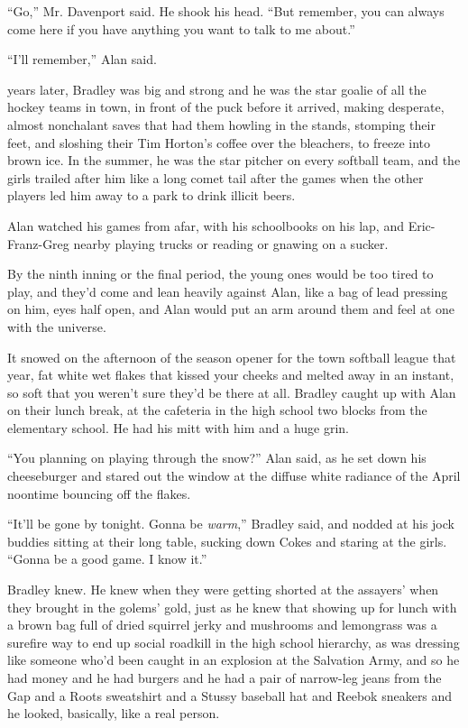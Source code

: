 ``Go,'' Mr.  Davenport said.  He shook his head.  ``But remember, you
can always come here if you have anything you want to talk to me
about.''

``I'll remember,'' Alan said.

 years later, Bradley was big and strong and he was the star goalie
of all the hockey teams in town, in front of the puck before it
arrived, making desperate, almost nonchalant saves that had them
howling in the stands, stomping their feet, and sloshing their Tim
Horton's coffee over the bleachers, to freeze into brown ice.  In the
summer, he was the star pitcher on every softball team, and the girls
trailed after him like a long comet tail after the games when the
other players led him away to a park to drink illicit beers.

Alan watched his games from afar, with his schoolbooks on his lap, and
Eric-Franz-Greg nearby playing trucks or reading or gnawing on a
sucker.

By the ninth inning or the final period, the young ones would be too
tired to play, and they'd come and lean heavily against Alan, like a
bag of lead pressing on him, eyes half open, and Alan would put an arm
around them and feel at one with the universe.

It snowed on the afternoon of the season opener for the town softball
league that year, fat white wet flakes that kissed your cheeks and
melted away in an instant, so soft that you weren't sure they'd be
there at all.  Bradley caught up with Alan on their lunch break, at
the cafeteria in the high school two blocks from the elementary
school.  He had his mitt with him and a huge grin.

``You planning on playing through the snow?'' Alan said, as he set
down his cheeseburger and stared out the window at the diffuse white
radiance of the April noontime bouncing off the flakes.

``It'll be gone by tonight.  Gonna be \textit{warm},'' Bradley said,
and nodded at his jock buddies sitting at their long table, sucking
down Cokes and staring at the girls.  ``Gonna be a good game.  I know
it.''

Bradley knew.  He knew when they were getting shorted at the assayers'
when they brought in the golems' gold, just as he knew that showing up
for lunch with a brown bag full of dried squirrel jerky and mushrooms
and lemongrass was a surefire way to end up social roadkill in the
high school hierarchy, as was dressing like someone who'd been caught
in an explosion at the Salvation Army, and so he had money and he had
burgers and he had a pair of narrow-leg jeans from the Gap and a Roots
sweatshirt and a Stussy baseball hat and Reebok sneakers and he
looked, basically, like a real person.

